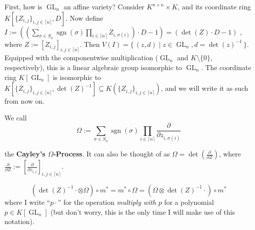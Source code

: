 First, how is $\operatorname{GL}_n$ an affine variety?
Consider $ K^{n \times n} \times K $, and its coordinate ring $ K\left\lbrack \lbrace Z_{i,j} \rbrace_{i,j \in \lceil n \rceil} , D \right\rbrack$.
Now define $ I := \left( \left( \sum_{\sigma \in S_n} \operatorname{sgn} \left( \sigma \right) \prod_{ i \in \lceil n \rceil } Z_{i, \sigma \left( i \right) } \right) \cdot D - 1 \right)  = \left( \operatorname{det} \left( Z \right) \cdot D - 1 \right) $ , where $ Z := \left\lbrack Z_{i,j} \right\rbrack_{i,j \in \lceil n \rceil} $.
Then $ V \left( I \right) = \lbrace \, \left( z , d \right) \mid z \in \operatorname{GL}_n , d = \operatorname{det} \left( z \right)^{-1} \, \rbrace $.
Equipped with the componentwise multiplication ($\operatorname{GL}_n$ and $K \setminus \lbrace 0 \rbrace$, respectively), this is a linear algebraic group isomorphic to $\operatorname{GL}_n$.
The coordinate ring $K\left\lbrack \operatorname{GL}_n\right\rbrack$ is isomorphic to $K \left\lbrack \lbrace Z_{i,j} \rbrace_{i,j \in \lceil n \rceil} , \operatorname{det} \left( Z \right)^{-1} \right\rbrack \subseteq K \left( \lbrace Z_{i,j} \rbrace_{i,j \in \lceil n \rceil} \right) $, and we will write it as such from now on.
\begin{definition}
  We call
  \begin{equation}
    \Omega := \sum_{\sigma \in S_n} \operatorname{sgn} \left( \sigma \right) \prod_{ i \in \lceil n \rceil } \frac{\partial}{\partial z_{i , \sigma \left( i \right)}}
  \end{equation}
\end{definition}
the \textbf{Cayley's $\Omega$-Process}.
It can also be thought of as $ \Omega = \operatorname{det} \left( \frac{\partial}{\partial Z} \right) $, where $\frac{\partial}{\partial Z} := \left\lbrack \frac{\partial}{\partial z_{i,j}} \right\rbrack_{i,j \in \lceil n \rceil} $.

\begin{lemma}
  \begin{equation}
    \left( \operatorname{det} \left( Z \right) ^{-1} \cdot \otimes \Omega \right) \circ m^\ast
    = m^\ast \circ \Omega
    = \left( \Omega \otimes \operatorname{det} \left( Z \right) ^{-1} \cdot \right) \circ m^\ast
  \end{equation}
  where I write ``$ p \cdot $'' for the operation \textit{multiply with $ p $} for a polynomial $ p \in K \left\lbrack \operatorname{GL}_n \right\rbrack $ (but don't worry, this is the only time I will make use of this notation).
\end{lemma}

